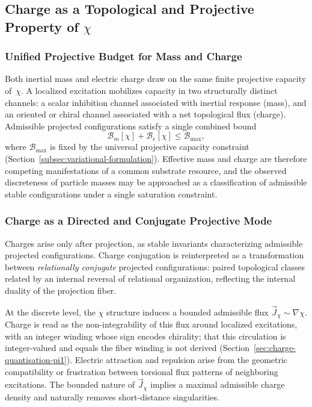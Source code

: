 \subsection{Charge as a Topological and Projective Property of \texorpdfstring{$\chi$}{χ}}
  \label{subsec:charge-as-a-topological-and-relaxational-property-of-chi}

  \subsubsection*{Unified Projective Budget for Mass and Charge}
    \label{subsec:unified_budget_mass_charge}

    Both inertial mass and electric charge draw on the same finite projective
    capacity of~$\chi$.
    A localized excitation mobilizes capacity in two structurally distinct
    channels: a scalar inhibition channel associated with inertial response
    (mass), and an oriented or chiral channel associated with a net
    topological flux (charge).
    Admissible projected configurations satisfy a single combined bound
    \begin{equation}
      \label{eq:combined_budget_bound}
      \mathcal{B}_m[\chi] + \mathcal{B}_e[\chi]
      \le \mathcal{B}_{\max},
    \end{equation}
    where $\mathcal{B}_{\max}$ is fixed by the universal projective capacity
    constraint (Section~\ref{subsec:variational-formulation}).
    Effective mass and charge are therefore competing manifestations of a
    common substrate resource, and the observed discreteness of particle
    masses may be approached as a classification of admissible stable
    configurations under a single saturation constraint.

  \subsubsection*{Charge as a Directed and Conjugate Projective Mode}
    \label{subsec:charge-as-directed-relaxation}

    Charges arise only after projection, as stable invariants characterizing
    admissible projected configurations.
    Charge conjugation is reinterpreted as a transformation between
    \emph{relationally conjugate} projected configurations: paired
    topological classes related by an internal reversal of relational
    organization, reflecting the internal duality of the projection fiber.

    At the discrete level, the $\chi$ structure induces a bounded admissible
    flux $\vec{J}_\chi \sim \nabla \chi$.
    Charge is read as the non-integrability of this flux around localized
    excitations, with an integer winding whose sign encodes chirality; that
    this circulation is integer-valued and equals the fiber winding is not
    derived (Section~\ref{sec:charge-quantisation-pi1}).
    Electric attraction and repulsion arise from the geometric compatibility
    or frustration between torsional flux patterns of neighboring
    excitations.
    The bounded nature of $\vec{J}_\chi$ implies a maximal admissible charge
    density and naturally removes short-distance singularities.

